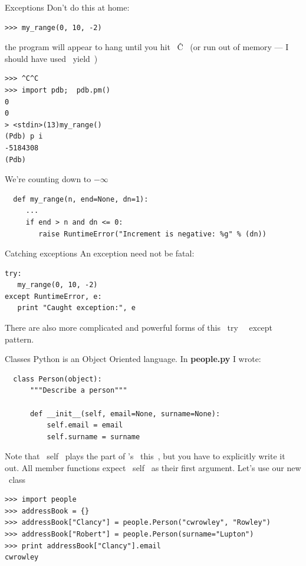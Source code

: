 \documentclass[10pt, t]{beamer}
\let\verb=\codeDelimTwiddles
\let\alert=\textbf
\begin{document}
\begin{frame}[fragile,label=sec-2-18]{Exceptions}
 Don't do this at home:
\lstset{language=Python,label= ,caption= ,numbers=none}
\begin{lstlisting}
>>> my_range(0, 10, -2)
\end{lstlisting}
\pause
the program will appear to hang until you hit \verb~\^C~ (or run out of memory --- I 
should have used \verb~yield~)
\pause 

\lstset{language=Python,label= ,caption= ,numbers=none}
\begin{lstlisting}
>>> ^C^C
>>> import pdb;  pdb.pm()
0
0
> <stdin>(13)my_range()
(Pdb) p i
-5184308
(Pdb)
\end{lstlisting}
We're counting down to $-\infty$

\pause
\lstset{language=Python,label= ,caption= ,numbers=none}
\begin{lstlisting}
  def my_range(n, end=None, dn=1):
     ...
     if end > n and dn <= 0:
        raise RuntimeError("Increment is negative: %g" % (dn))
\end{lstlisting}
\end{frame}
\begin{frame}[fragile,label=sec-2-19]{Catching exceptions}
 An exception need not be fatal:
\lstset{language=Python,label= ,caption= ,numbers=none}
\begin{lstlisting}
try:
   my_range(0, 10, -2)
except RuntimeError, e:
   print "Caught exception:", e
\end{lstlisting}
\pause
There are also more complicated and powerful forms of this \verb~try~ \verb~except~ pattern.
\end{frame}
\begin{frame}[fragile,label=sec-2-20]{Classes}
 Python is an Object Oriented language.
In \alert{people.py} I wrote:
\lstset{language=Python,label= ,caption= ,numbers=none}
\begin{lstlisting}
  class Person(object):
      """Describe a person"""
  
      def __init__(self, email=None, surname=None):
          self.email = email
          self.surname = surname
\end{lstlisting}
\pause
Note that \verb~self~ plays the part of \CPP's \verb~this~, but you have to explicitly write it out.  All member
functions expect \verb~self~ as their first argument.
\pause Let's use our new \verb~class~
\lstset{language=Python,label= ,caption= ,numbers=none}
\begin{lstlisting}
>>> import people
>>> addressBook = {}
>>> addressBook["Clancy"] = people.Person("cwrowley", "Rowley")
>>> addressBook["Robert"] = people.Person(surname="Lupton")
>>> print addressBook["Clancy"].email
cwrowley
\end{lstlisting}
\end{frame}
\end{document}
